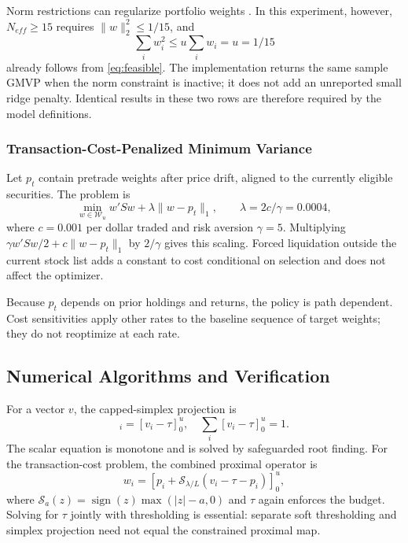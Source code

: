 \documentclass[letterpaper,journal]{IEEEtran}
\begin{document}
Norm restrictions can regularize portfolio weights \cite{norm}. In this experiment, however, $N_{eff}\geq15$ requires $\|w\|_2^2\leq1/15$, and
\begin{equation}
 \sum_iw_i^2\leq u\sum_iw_i=u=1/15
\end{equation}
already follows from \eqref{eq:feasible}. The implementation returns the same sample GMVP when the norm constraint is inactive; it does not add an unreported small ridge penalty. Identical results in these two rows are therefore required by the model definitions.

\subsubsection{Transaction-Cost-Penalized Minimum Variance}
Let $p_t$ contain pretrade weights after price drift, aligned to the currently eligible securities. The problem is
\begin{equation}\label{eq:tc}
 \min_{w\in\mathcal W_u} w'Sw+\lambda\|w-p_t\|_1,\qquad
 \lambda=2c/\gamma=0.0004,
\end{equation}
where $c=0.001$ per dollar traded and risk aversion $\gamma=5$. Multiplying $\gamma w'Sw/2+c\|w-p_t\|_1$ by $2/\gamma$ gives this scaling. Forced liquidation outside the current stock list adds a constant to cost conditional on selection and does not affect the optimizer.

Because $p_t$ depends on prior holdings and returns, the policy is path dependent. Cost sensitivities apply other rates to the baseline sequence of target weights; they do not reoptimize at each rate.

\subsection{Numerical Algorithms and Verification}\label{sec:numerics}
For a vector $v$, the capped-simplex projection is
\begin{equation}
 [\Pi_{\mathcal W_u}(v)]_i=[v_i-\tau]_0^u,\quad
 \sum_i[v_i-\tau]_0^u=1.
\end{equation}
The scalar equation is monotone and is solved by safeguarded root finding. For the transaction-cost problem, the combined proximal operator is
\begin{equation}\label{eq:prox}
 w_i=[p_i+\mathcal S_{\lambda/L}(v_i-\tau-p_i)]_0^u,
\end{equation}
where $\mathcal S_a(z)=\operatorname{sign}(z)\max(|z|-a,0)$ and $\tau$ again enforces the budget. Solving for $\tau$ jointly with thresholding is essential: separate soft thresholding and simplex projection need not equal the constrained proximal map.
\end{document}

